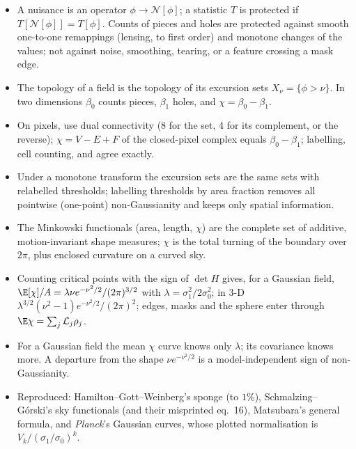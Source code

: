 \begin{recap}
\begin{itemize}
  \item A nuisance is an operator $\phi\to\mathcal N[\phi]$; a statistic $T$ is protected if
        $T[\mathcal N[\phi]]=T[\phi]$. Counts of pieces and holes are protected against smooth one-to-one
        remappings (lensing, to first order) and monotone changes of the values; not against noise, smoothing,
        tearing, or a feature crossing a mask edge.
  \item The topology of a field is the topology of its excursion sets $X_\nu=\{\phi>\nu\}$. In two dimensions
        $\beta_0$ counts pieces, $\beta_1$ holes, and $\chi=\beta_0-\beta_1$.
  \item On pixels, use dual connectivity (8 for the set, 4 for its complement, or the reverse); $\chi=V-E+F$ of
        the closed-pixel complex equals $\beta_0-\beta_1$; labelling, cell counting,  and
         agree exactly.
  \item Under a monotone transform the excursion sets are the same sets with relabelled thresholds; labelling
        thresholds by area fraction removes all pointwise (one-point) non-Gaussianity and keeps only spatial
        information.
  \item The Minkowski functionals (area, length, $\chi$) are the complete set of additive, motion-invariant shape
        measures; $\chi$ is the total turning of the boundary over $2\pi$, plus enclosed curvature on a curved sky.
  \item Counting critical points with the sign of $\det H$ gives, for a Gaussian field,
        $\E[\chi]/A=\lambda\nu e^{-\nu^2/2}/(2\pi)^{3/2}$ with $\lambda=\sigma_1^2/2\sigma_0^2$; in 3-D
        $\lambda^{3/2}(\nu^2-1)e^{-\nu^2/2}/(2\pi)^2$; edges, masks and the sphere enter through
        $\E\chi=\sum_j\mathcal L_j\rho_j$.
  \item For a Gaussian field the mean $\chi$ curve knows only $\lambda$; its covariance knows more. A departure from
        the shape $\nu e^{-\nu^2/2}$ is a model-independent sign of non-Gaussianity.
  \item Reproduced: Hamilton--Gott--Weinberg's sponge (to $1\%$), Schmalzing--G\'orski's sky functionals (and their
        misprinted eq.~16), Matsubara's general formula, and \textit{Planck}'s Gaussian curves, whose plotted
        normalisation is $V_k/(\sigma_1/\sigma_0)^k$.
\end{itemize}
\end{recap}
